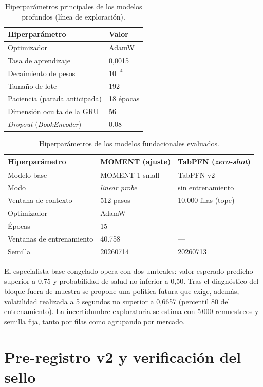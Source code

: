 \begin{table}[h]
\centering
\caption{Hiperparámetros principales de los modelos profundos (línea de exploración).}
\begin{tabular}{ll}
\toprule
\textbf{Hiperparámetro} & \textbf{Valor} \\
\midrule
Optimizador & AdamW \\
Tasa de aprendizaje & 0,0015 \\
Decaimiento de pesos & $10^{-4}$ \\
Tamaño de lote & 192 \\
Paciencia (parada anticipada) & 18 épocas \\
Dimensión oculta de la GRU & 56 \\
\emph{Dropout} (\emph{BookEncoder}) & 0,08 \\
\bottomrule
\end{tabular}
\end{table}

\begin{table}[h]
\centering
\caption{Hiperparámetros de los modelos fundacionales evaluados.}
\begin{tabular}{lll}
\toprule
\textbf{Hiperparámetro} & \textbf{MOMENT (ajuste)} & \textbf{TabPFN (\emph{zero-shot})} \\
\midrule
Modelo base & MOMENT-1-small & TabPFN v2 \\
Modo & \emph{linear probe} & sin entrenamiento \\
Ventana de contexto & 512 pasos & 10.000 filas (tope) \\
Optimizador & AdamW & --- \\
Épocas & 15 & --- \\
Ventanas de entrenamiento & 40.758 & --- \\
Semilla & 20260714 & 20260713 \\
\bottomrule
\end{tabular}
\end{table}

El especialista base congelado opera con dos umbrales: valor esperado predicho superior a
0,75 y probabilidad de salud no inferior a 0,50. Tras el diagnóstico del bloque fuera de
muestra se propone una política futura que exige, además, volatilidad realizada a 5 segundos
no superior a 0,6657 (percentil 80 del entrenamiento). La incertidumbre exploratoria se
estima con 5\,000 remuestreos y semilla fija, tanto por filas como agrupando por mercado.

\chapter{Pre-registro v2 y verificación del sello}
\label{anexo:preregistro}

